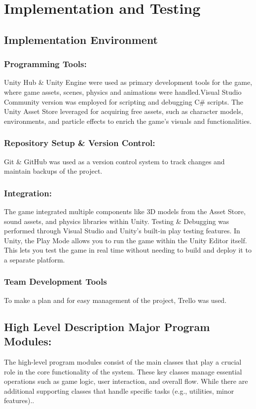 \chapter{Implementation and Testing}
\section{Implementation Environment}
\subsection{Programming Tools:}
Unity Hub \& Unity Engine were used as primary development tools for the game, where game assets, scenes, physics and animations were handled.Visual Studio Community version was employed for scripting and debugging C\# scripts.
The Unity Asset Store leveraged for acquiring free assets, such as character models, environments, and particle effects to enrich the game's visuals and functionalities.
\subsection{Repository Setup \& Version Control:}
Git \& GitHub was used as a version control system to track changes and maintain backups of the project.
\subsection{Integration:}
The game integrated multiple components like 3D models from the Asset Store, sound assets, and physics libraries within Unity.
Testing \& Debugging was performed through Visual Studio and Unity’s built-in play testing features.
In Unity, the Play Mode allows you to run the game within the Unity Editor itself. This lets you test the game in real time without needing to build and deploy it to a separate platform.
\subsection{Team Development Tools}
To make a plan and for easy management of the project, Trello was used.
\section{High Level Description Major Program Modules:}
The high-level program modules consist of the main classes that play a crucial role in the core functionality of the system. These key classes manage essential operations such as game logic, user interaction, and overall flow. While there are additional supporting classes that handle specific tasks (e.g., utilities, minor features)..
